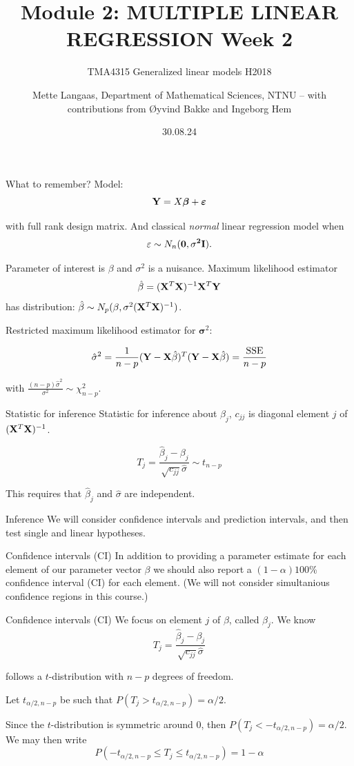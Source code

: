\documentclass[
  ignorenonframetext,
]{beamer}
\title{Module 2: MULTIPLE LINEAR REGRESSION Week 2}
\subtitle{TMA4315 Generalized linear models H2018}
\author{Mette Langaas, Department of Mathematical Sciences, NTNU -- with
contributions from Øyvind Bakke and Ingeborg Hem}
\date{30.08.24}
\begin{document}
\frame{\titlepage}

\begin{frame}{What to remember?}
\label{what-to-remember}
Model: \[
{\bf Y}= X {\boldsymbol \beta}+\boldsymbol{\varepsilon}
\]

with full rank design matrix. And classical \emph{normal} linear
regression model when \[\varepsilon\sim N_n(\bf{0},\sigma^2\bf{I}).\]

Parameter of interest is \(\beta\) and \(\sigma^2\) is a nuisance.
Maximum likelihood estimator
\[ \hat\beta=({\bf X}^T{\bf X})^{-1} {\bf X}^T {\bf Y}\] has
distribution:
\(\hat{\beta}\sim N_{p}(\beta,\sigma^2({\bf X}^T{\bf X})^{-1})\).

Restricted maximum likelihood estimator for \({\boldsymbol \sigma}^2\):

\[
\hat{\sigma}^2=\frac{1}{n-p}({\bf Y}-{\bf X}\hat{\beta})^T({\bf Y}-{\bf X}\hat{\beta})=\frac{\text{SSE}}{n-p}
\]

with \(\frac{(n-p)\hat{\sigma}^2}{\sigma^2} \sim \chi^2_{n-p}\).
\end{frame}

\begin{frame}{Statistic for inference}
\label{statistic-for-inference}
Statistic for inference about \(\beta_j\), \(c_{jj}\) is diagonal
element \(j\) of \(({\bf X}^T{\bf X})^{-1}\).

\[
T_j=\frac{\hat{\beta}_j-\beta_j}{\sqrt{c_{jj}}\hat{\sigma}}\sim t_{n-p}
\]

This requires that \(\hat{\beta}_j\) and \(\hat{\sigma}\) are
independent.
\end{frame}

\begin{frame}{Inference}
\label{inference}
We will consider confidence intervals and prediction intervals, and then
test single and linear hypotheses.
\end{frame}

\begin{frame}{Confidence intervals (CI)}
\label{confidence-intervals-ci}
In addition to providing a parameter estimate for each element of our
parameter vector \(\beta\) we should also report a \((1-\alpha)100\)\%
confidence interval (CI) for each element. (We will not consider
simultanious confidence regions in this course.)
\end{frame}

\begin{frame}{Confidence intervals (CI)}
\label{confidence-intervals-ci-1}
We focus on element \(j\) of \(\beta\), called \(\beta_j\). We know \[
T_j =\frac{\hat{\beta}_j-\beta_j}{\sqrt{c_{jj}}\hat{\sigma}}
\]

follows a \(t\)-distribution with \(n-p\) degrees of freedom.

Let \(t_{\alpha/2,n-p}\) be such that
\(P(T_j>t_{\alpha/2,n-p})=\alpha/2\).

Since the \(t\)-distribution is symmetric around 0, then
\(P(T_j< -t_{\alpha/2,n-p})=\alpha/2\). We may then write
\[P(-t_{\alpha/2,n-p}\le T_j \le t_{\alpha/2,n-p})=1-\alpha\]
\end{frame}
\end{document}
